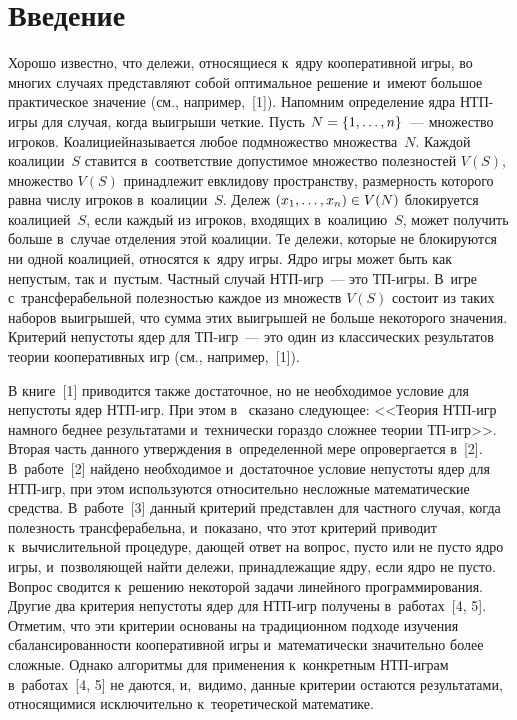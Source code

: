 \thispagestyle{headings}

\begin{multicols}{2}

\label{st\stat}
      
\section{Введение}

\vspace*{-3pt}

    Хорошо известно, что дележи, относящиеся к~ядру кооперативной игры, 
во многих случаях представляют собой оптимальное решение и~имеют большое 
практическое значение (см., например,~[1]). Напомним определение ядра НТП-иг\-ры\linebreak
    для случая, когда выигрыши четкие. 
Пусть $N\hm= \{1, \ldots , n\}$~--- множество игроков. Коалицией\linebreak называется 
любое подмножество множества~$N$. Каж\-дой коалиции~$S$ ставится 
в~соответствие допустимое множество полезностей $V(S)$, множество $V(S)$ 
принадлежит евклидову пространству, размерность которого равна числу 
игроков в~коалиции~$S$. Дележ $(x_1, \ldots ,x_n)\hm\in V(N)$ блокируется 
коалицией~$S$, если каждый из игроков, входящих в~коалицию~$S$, может 
получить больше в~случае отделения этой коалиции. Те дележи, которые не 
блокируются ни одной коалицией, относятся к~ядру игры. Ядро игры может 
быть как непустым, так и~пустым. Частный случай НТП-игр~--- 
это ТП-иг\-ры. В~игре с~трансферабельной полезностью каждое из множеств $V(S)$ состоит из таких 
наборов выигрышей, что сумма этих выигрышей не больше некоторого 
значения. Критерий непустоты ядер для ТП-игр~--- это один из классических результатов тео\-рии 
кооперативных игр (см., например,~[1]).

     В книге~[1] приводится также достаточное, но не необходимое условие 
для непустоты ядер НТП-игр. 
При этом в~\cite[с.~148]{1-sh} сказано следующее: <<Тео\-рия НТП-игр 
намного беднее результатами и~технически гораздо сложнее теории ТП-игр>>. 
Вторая часть данного утверждения в~определенной мере опровергается в~[2]. 
В~работе~[2] найдено необходимое и~достаточное условие непустоты ядер для 
НТП-игр, при этом используются относительно 
несложные математические средства. В~работе~[3] данный критерий 
пред\-став\-лен для частного случая, когда полезность трансферабельна, 
и~показано, что этот критерий приводит к~вычислительной процедуре, дающей 
ответ на вопрос, пусто или не пусто ядро игры, и~позволяющей найти дележи, 
принадлежащие ядру, если ядро не пусто. Вопрос сводится к~решению 
некоторой задачи линейного программирования. Другие два критерия 
непустоты ядер для НТП-игр получены 
в~работах~[4, 5]. Отметим, что эти критерии основаны на традиционном подходе 
изучения сбалансированности кооперативной игры и~математически 
значительно более сложные. Однако алгоритмы для применения к~конкретным 
НТП-иг\-рам в~работах~[4, 5] не даются, 
и,~видимо, данные критерии остаются результатами, относящимися 
исключительно к~теоретической математике.


\end{multicols}
